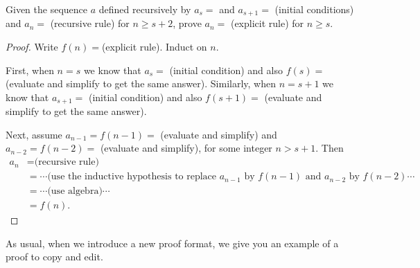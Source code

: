 \begin{pff}
\label{pff_strong_math_ind_seq}
    Given the sequence $a$ defined recursively by $a_s=$ and $a_{s+1}=$ (initial conditions) and $a_n=$ (recursive rule) for $n \ge s+2$, prove $a_n=$ (explicit rule) for $n \ge s$.
    \begin{proof}
        Write $f(n) = $(explicit rule).  Induct on $n$.

        First, when $n=s$ we know that $a_s=$ (initial condition) and also $f(s)=$ (evaluate and simplify to get the same answer).  Similarly, when $n=s+1$ we know that $a_{s+1}=$ (initial condition) and also $f(s+1)=$ (evaluate and simplify to get the same answer).

        Next, assume $a_{n-1}=f(n-1)= $ (evaluate and simplify) and $a_{n-2} = f(n-2) = $ (evaluate and simplify), for some integer $n > s+1$.  Then 
            \begin{align*}
                a_n & = \text{(recursive rule)} \\
                & = \cdots \text{(use the inductive hypothesis to replace } a_{n-1} \text{ by } f(n-1) \text{ and } a_{n-2} \text{ by } f(n-2) \cdots \\ 
                & = \cdots \text{(use algebra)} \cdots \\
                & = f(n).
            \end{align*}
    \end{proof}
\end{pff}

As usual, when we introduce a new proof format, we give you an example of a proof to copy and edit.

